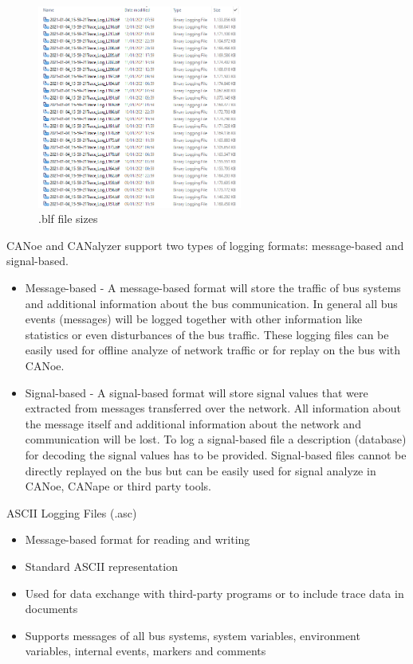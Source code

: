\begin{figure}[!h]
  \centering
  \includegraphics[width= 0.6\textwidth]{images/blfsize.png}
  \caption{.blf file sizes}
  \label{fig:Individual File Size .blf}
\end{figure}

CANoe and CANalyzer support two types of logging formats: message-based and signal-based.
\begin{itemize}
    \item Message-based - 
        A message-based format will store the traffic of bus systems and additional information about the bus communication. In general all bus events (messages) will be logged together with other information like statistics or even disturbances of the bus traffic. These logging files can be easily used for offline analyze of network traffic or for replay on the bus with CANoe.  
    \item Signal-based -
        A signal-based format will store signal values that were extracted from messages transferred over the network. All information about the message itself and additional information about the network and communication will be lost. To log a signal-based file a description (database) for decoding the signal values has to be provided. Signal-based files cannot be directly replayed on the bus but can be easily used for signal analyze in CANoe, CANape or third party tools.
\end{itemize}

ASCII Logging Files (.asc)

\begin{itemize}
    \item Message-based format for reading and writing
    \item Standard ASCII representation
    \item Used for data exchange with third-party programs or to include trace data in documents
    \item Supports messages of all bus systems, system variables, environment variables, internal events, markers and comments
\end{itemize}

